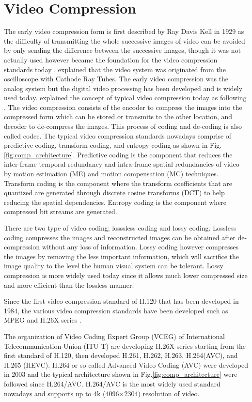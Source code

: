 \section{Video Compression}
\label{sec:introduction/section_b}

The early video compression form is first described by Ray Davis Kell in 1929 as the difficulty of transmitting the whole successive images of video can be avoided by only sending the difference between the successive images, though it was not actually used however became the foundation for the video compression standards today \cite{jacobs_brief_2009}. \citeauthor{jacobs_brief_2009} explained that the video system was originated from the oscilloscope with Cathode Ray Tubes. The early video compression was the analog system but the digital video processing has been developed and is widely used today. \citeauthor{zhang_overview_2019} explained the concept of typical video compression today as following \cite{zhang_overview_2019}. The video compression consists of the encoder to compress the images into the compressed form which can be stored or transmits to the other location, and decoder to de-compress the images. This process of coding and de-coding is also called codec. The typical video compression standards nowadays comprise of predictive coding, transform coding, and entropy coding as shown in Fig. \ref{fig:comp_architecture}. Predictive coding is the component that reduces the inter-frame temporal redundancy and intra-frame spatial redundancies of video by motion estimation (ME) and motion compensation (MC) techniques. Transform coding is the component where the transform coefficients that are quantized are generated through discrete cosine transforms (DCT) to help reducing the spatial dependencies. Entropy coding is the component where compressed bit streams are generated.



There are two type of video coding; losssless coding and lossy coding. Lossless coding compresses the images and reconstructed images can be obtained after de-compression without any loss of information. Lossy coding however compresses the images by removing the less important information, which will sacrifice the image quality to the level the human visual system can be tolerant. Lossy compression is more widely used today since it allows much lower compressed size and more efficient than the lossless manner.

Since the first video compression standard of H.120 that has been developed in 1984, the various video compression standards have been developed such as MPEG and H.26X series \cite{zhang_overview_2019}.




The organization of Video Coding Expert Group (VCEG) of International Telecommunication Union (ITU-T) are developing H.26X series starting from the first standard of H.120, then developed H.261, H.262, H.263, H.264(AVC), and H.265 (HEVC). H.264 or so called Advanced Video Coding (AVC) were developed in 2003 and the typical architecture shown in Fig.\ref{fig:comp_architecture} were followed since H.264/AVC. H.264/AVC is the most widely used standard nowadays and supports up to 4k (4096×2304) resolution of video.
